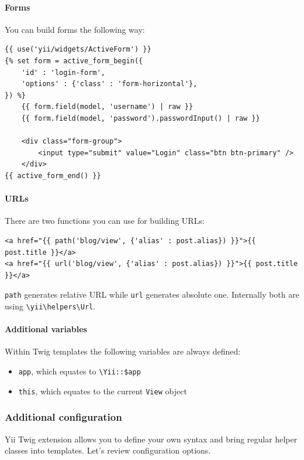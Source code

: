 \paragraph{Forms}
You can build forms the following way:

\begin{lstlisting}
{{ use('yii/widgets/ActiveForm') }}
{% set form = active_form_begin({
    'id' : 'login-form',
    'options' : {'class' : 'form-horizontal'},
}) %}
    {{ form.field(model, 'username') | raw }}
    {{ form.field(model, 'password').passwordInput() | raw }}

    <div class="form-group">
        <input type="submit" value="Login" class="btn btn-primary" />
    </div>
{{ active_form_end() }}
\end{lstlisting}
\paragraph{URLs}
There are two functions you can use for building URLs:

\lstset{language=php}\begin{lstlisting}
<a href="{{ path('blog/view', {'alias' : post.alias}) }}">{{ post.title }}</a>
<a href="{{ url('blog/view', {'alias' : post.alias}) }}">{{ post.title }}</a>
\end{lstlisting}
\lstinline|path| generates relative URL while \lstinline|url| generates absolute one. Internally both are using \texttt{{\allowbreak{}\textbackslash}yii{\allowbreak{}\textbackslash}helpers{\allowbreak{}\textbackslash}Url}.

\paragraph{Additional variables}
Within Twig templates the following variables are always defined:

\begin{itemize}
\item \lstinline|app|, which equates to \lstinline|\Yii::$app|
\item \lstinline|this|, which equates to the current \lstinline|View| object
\end{itemize}
\subsubsection{Additional configuration}
Yii Twig extension allows you to define your own syntax and bring regular helper classes into templates. Let's review
configuration options.


